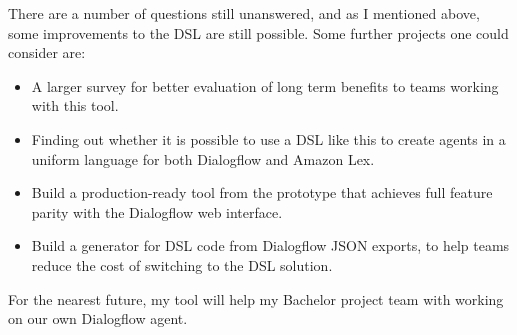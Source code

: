 There are a number of questions still unanswered, and as I mentioned above, some improvements to the DSL are still possible.
Some further projects one could consider are:
\begin{itemize}
    \item A larger survey for better evaluation of long term benefits to teams working with this tool.
    \item Finding out whether it is possible to use a DSL like this to create agents in a uniform language for both Dialogflow and Amazon Lex.
    \item Build a production-ready tool from the prototype that achieves full feature parity with the Dialogflow web interface.
    \item Build a generator for DSL code from Dialogflow JSON exports, to help teams reduce the cost of switching to the DSL solution.
\end{itemize}

For the nearest future, my tool will help my Bachelor project team with working on our own Dialogflow agent.
